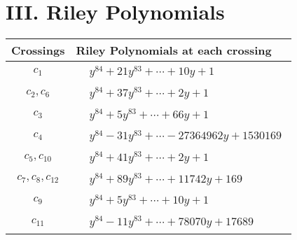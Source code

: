 \documentclass[1p]{elsarticle_modified}
\theoremstyle{definition}
\begin{document}
\centering \section*{ III. Riley Polynomials}
\begin{tabular}{m{50pt}|m{274pt}}
Crossings & \hspace{64pt}Riley Polynomials at each crossing \\
\hline $$\begin{aligned}c_{1}\end{aligned}$$&$\begin{aligned}
&y^{84}+21 y^{83}+\cdots+10 y+1
\end{aligned}$\\
\hline $$\begin{aligned}c_{2},c_{6}\end{aligned}$$&$\begin{aligned}
&y^{84}+37 y^{83}+\cdots+2 y+1
\end{aligned}$\\
\hline $$\begin{aligned}c_{3}\end{aligned}$$&$\begin{aligned}
&y^{84}+5 y^{83}+\cdots+66 y+1
\end{aligned}$\\
\hline $$\begin{aligned}c_{4}\end{aligned}$$&$\begin{aligned}
&y^{84}-31 y^{83}+\cdots-27364962 y+1530169
\end{aligned}$\\
\hline $$\begin{aligned}c_{5},c_{10}\end{aligned}$$&$\begin{aligned}
&y^{84}+41 y^{83}+\cdots+2 y+1
\end{aligned}$\\
\hline $$\begin{aligned}c_{7},c_{8},c_{12}\end{aligned}$$&$\begin{aligned}
&y^{84}+89 y^{83}+\cdots+11742 y+169
\end{aligned}$\\
\hline $$\begin{aligned}c_{9}\end{aligned}$$&$\begin{aligned}
&y^{84}+5 y^{83}+\cdots+10 y+1
\end{aligned}$\\
\hline $$\begin{aligned}c_{11}\end{aligned}$$&$\begin{aligned}
&y^{84}-11 y^{83}+\cdots+78070 y+17689
\end{aligned}$\\
\hline
\end{tabular}
\vskip 2pc
\end{document}
